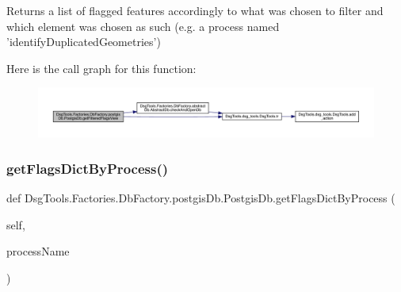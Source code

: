 \begin{DoxyVerb}Returns a list of flagged features accordingly to what
was chosen to filter and which element was chosen as such
(e.g. a process named 'identifyDuplicatedGeometries') 
\end{DoxyVerb}
 Here is the call graph for this function\+:
\nopagebreak
\begin{figure}[H]
\begin{center}
\leavevmode
\includegraphics[width=350pt]{class_dsg_tools_1_1_factories_1_1_db_factory_1_1postgis_db_1_1_postgis_db_a896ec652f3cbba47db10350f8d3ea7bb_cgraph}
\end{center}
\end{figure}
\mbox{\label{class_dsg_tools_1_1_factories_1_1_db_factory_1_1postgis_db_1_1_postgis_db_a97b87cae87f92baded73ccea3f5b85cc}} 
\subsubsection{\texorpdfstring{get\+Flags\+Dict\+By\+Process()}{getFlagsDictByProcess()}}
{\footnotesize\ttfamily def Dsg\+Tools.\+Factories.\+Db\+Factory.\+postgis\+Db.\+Postgis\+Db.\+get\+Flags\+Dict\+By\+Process (\begin{DoxyParamCaption}\item[{}]{self,  }\item[{}]{process\+Name }\end{DoxyParamCaption})}

